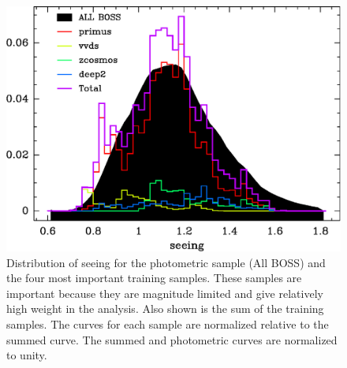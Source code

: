 \documentclass[preprint]{aastex}
\begin{document}
\begin{figure}[h]\centering
    \includegraphics[scale=0.7]{figures/primus-vvds-zcosmos-deep2-match-seeing-10.eps}

    \caption{Distribution of seeing for the photometric sample (All BOSS) and
    the four most important training samples.  These samples are important
    because they are magnitude limited and give relatively high weight in the
    analysis.  Also shown is the sum of the training samples.  The curves for
    each sample are normalized relative to the summed curve.  The summed and
    photometric curves are normalized to unity.}

    \label{fig:seeing}
\end{figure}
\end{document}
